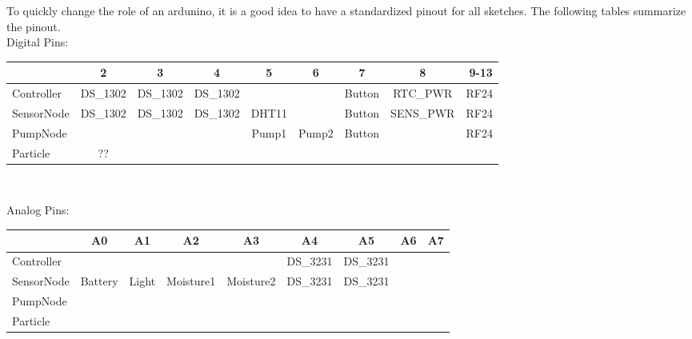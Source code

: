 To quickly change the role of an ardunino, it is a good idea to have a standardized pinout for all sketches. The following tables summarize the pinout.\\

Digital Pins:

\begin{table}[htbp]
        \small
        \setlength\tabcolsep{2pt}
\begin{tabular}{ |l|*{7}{c|}r| }
  \hline   & 2 & 3 & 4 & 5 & 6 & 7 & 8 & 9-13 \\ \hline
  Controller & DS\_1302 & DS\_1302 & DS\_1302 &  &  & Button  & RTC\_PWR &  RF24   \\ \hline
  SensorNode & DS\_1302 & DS\_1302 & DS\_1302 &  DHT11  &         & Button  &SENS\_PWR &  RF24  \\ \hline
  PumpNode & & & &  Pump1  &  Pump2  & Button  &         &  RF24   \\ \hline
  Particle & ?? & & & & & & &  \\ \hline
\end{tabular}\\
\end{table}

Analog Pins:

\begin{table}[htbp]
        \small
        \setlength\tabcolsep{2pt}
\begin{tabular} { |l|*{7}{c|}r| }
  \hline   & A0 & A1 & A2 & A3 & A4 & A5 & A6 & A7 \\ \hline
  Controller & & & & & DS\_3231 & DS\_3231 & &  \\ \hline
  SensorNode & Battery & Light & Moisture1 & Moisture2 & DS\_3231 & DS\_3231 &  &  \\ \hline
  PumpNode &  & & & & & & &  \\ \hline
  Particle & & & & & & & &  \\ \hline
\end{tabular}\\
\end{table}

